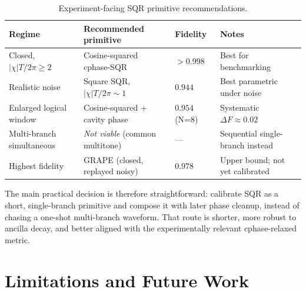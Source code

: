 \documentclass[aps,pra,twocolumn,reprint,amsmath,amssymb]{revtex4-2}
\begin{document}
\begin{table}[tp]
\centering
\caption{Experiment-facing SQR primitive recommendations.}
\small
\begin{tabular}{@{} l l l l @{}}
\toprule
Regime & Recommended primitive & Fidelity & Notes \\
\midrule
Closed, $|\chi|T/2\pi\ge 2$ & Cosine-squared cphase-SQR & $>0.998$ & Best for benchmarking \\
Realistic noise & Square SQR, $|\chi|T/2\pi\sim 1$ & $0.944$ & Best parametric under noise \\
Enlarged logical window & Cosine-squared + cavity phase & $0.954$ (N=8) & Systematic $\Delta F\approx 0.02$ \\
Multi-branch simultaneous & \emph{Not viable} (common multitone) & --- & Sequential single-branch instead \\
Highest fidelity & GRAPE (closed, replayed noisy) & $0.978$ & Upper bound; not yet calibrated \\
\bottomrule
\end{tabular}
\normalsize
\end{table}

The main practical decision is therefore straightforward: calibrate SQR as a short, single-branch primitive and compose it with later phase cleanup, instead of chasing a one-shot multi-branch waveform. That route is shorter, more robust to ancilla decay, and better aligned with the experimentally relevant cphase-relaxed metric.

\section{Limitations and Future Work}
\end{document}
